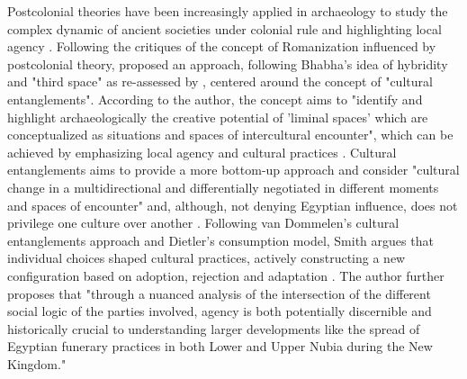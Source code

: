 Postcolonial theories have been increasingly applied in archaeology to study the complex dynamic of ancient societies under colonial rule and highlighting local agency \parencites{gosdenPostcolonialArchaeologyIssues2001, vandommelenColonialMattersMaterial2006}. Following the critiques of the concept of Romanization influenced by postcolonial theory, \textcites{vanpeltRevisingEgyptoNubianRelations2013} proposed an approach, following Bhabha's idea of hybridity and "third space" \textcite{bhabhaLocationCulture1994} as re-assessed by \textcites{stockhammerConceptualizingCulturalHybridization2012, stockhammerHybridityEntanglementEssentialism2013}, centered around the concept of "cultural entanglements". According to the author, the concept aims to "identify and highlight archaeologically the creative potential of 'liminal spaces' which are conceptualized as situations and spaces of intercultural encounter", which can be achieved by emphasizing local agency and cultural practices \parencites[p.~533]{vanpeltRevisingEgyptoNubianRelations2013}. Cultural entanglements aims to provide a more bottom-up approach and consider "cultural change in a multidirectional and differentially negotiated in different moments and spaces of encounter" and, although, not denying Egyptian influence, does not privilege one culture over another \parencites[p.~541]{vanpeltRevisingEgyptoNubianRelations2013}. Following van Dommelen's cultural entanglements approach and Dietler's consumption model, Smith \textcite[p.~372]{smithNubianExperienceEgyptian2020} argues that individual choices shaped cultural practices, actively constructing a new configuration based on adoption, rejection and adaptation \parencites{vandommelenColonialInteractionsHybrid2005, dietlerConsumption2010}. The author further proposes that "through a nuanced analysis of the intersection of the different social logic of the parties involved, agency is both potentially discernible and historically crucial to understanding larger developments like the spread of Egyptian funerary practices in both Lower and Upper Nubia during the New Kingdom." 


